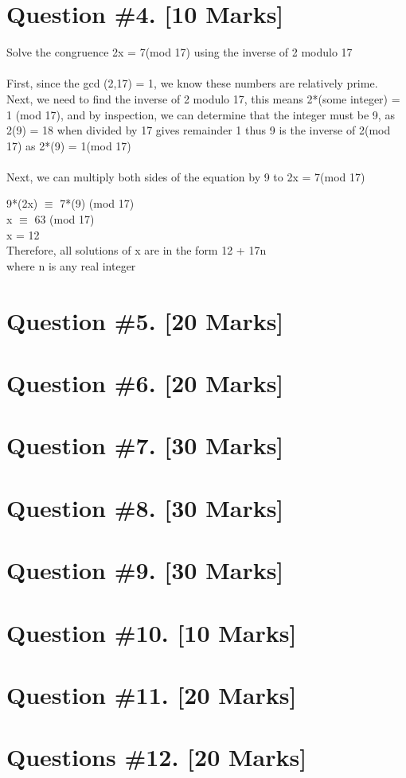 \documentclass{article}
\begin{document}
\section{Question \#4. [10 Marks]}
Solve the congruence 2x = 7(mod 17) using the inverse of 2 modulo 17 \\\\
First, since the gcd (2,17) = 1, we know these numbers are relatively prime. \\
Next, we need to find the inverse of 2 modulo 17, this means 2*(some integer) = 1 (mod 17), and by inspection, we can determine that the integer must be 9, as 2(9) = 18 when divided by 17 gives remainder 1 thus 9 is the inverse of 2(mod 17) as 2*(9) = 1(mod 17)\\ \\ 
Next, we can multiply both sides of the equation by 9 to 2x = 7(mod 17) \\ 
\begin{center}
9*(2x) $\equiv$ 7*(9) (mod 17) \\
x $\equiv$ 63 (mod 17) \\ 
x = 12 \\ 
Therefore, all solutions of x are in the form 12 + 17n\\ where n is any real integer
\end{center}

\newpage


\section{Question \#5. [20 Marks]}

\newpage 
\section{Question \#6. [20 Marks]}

\newpage

\section{Question \#7. [30 Marks]}

\newpage

\section{Question \#8. [30 Marks]}

\newpage

\section{Question \#9. [30 Marks]}

\newpage

\section{Question \#10. [10 Marks]} 

\newpage

\section{Question \#11. [20 Marks]}

\newpage

\section{Questions \#12. [20 Marks]} 
\end{document}
